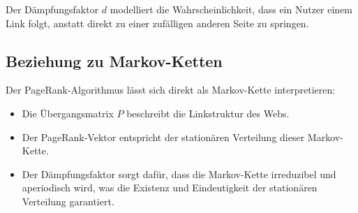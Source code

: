 Der Dämpfungsfaktor $d$ modelliert die Wahrscheinlichkeit, dass ein Nutzer einem Link folgt, anstatt direkt zu einer zufälligen anderen Seite zu springen.

\subsection{Beziehung zu Markov-Ketten}

Der PageRank-Algorithmus lässt sich direkt als Markov-Kette interpretieren:

\begin{itemize}
    \item Die Übergangsmatrix $P$ beschreibt die Linkstruktur des Webs.
    \item Der PageRank-Vektor entspricht der stationären Verteilung dieser Markov-Kette.
    \item Der Dämpfungsfaktor sorgt dafür, dass die Markov-Kette irreduzibel und aperiodisch wird, was die Existenz und Eindeutigkeit der stationären Verteilung garantiert.
\end{itemize}

